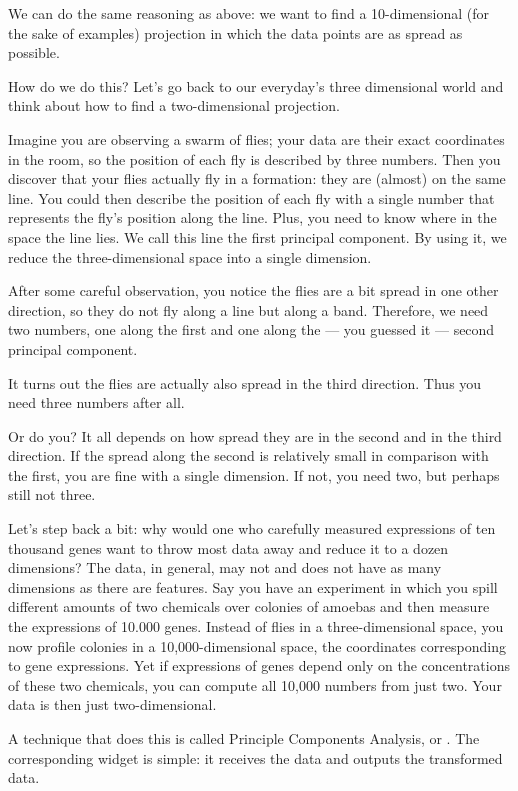 We can do the same reasoning as above: we want to find a 10-dimensional (for the sake of examples) projection in which the data  points are as spread as possible.

How do we do this? Let's go back to our everyday's three dimensional world and think about how to find a two-dimensional projection.

Imagine you are observing a swarm of flies; your data are their exact coordinates in the room, so the position of each fly is described by three numbers. Then you discover that your flies actually fly in a formation: they are (almost) on the same line. You could then describe the position of each fly with a single number that represents the fly's position along the line. Plus, you need to know where in the space the line lies. We call this line the first principal component. By using it, we reduce the three-dimensional space into a single dimension.

After some careful observation, you notice the flies are a bit spread in one other direction, so they do not fly along a line but along a band. Therefore, we need two numbers, one along the first and one along the — you guessed it — second principal component.

It turns out the flies are actually also spread in the third direction. Thus you need three numbers after all.

Or do you? It all depends on how spread they are in the second and in the third direction. If the spread along the second is relatively small in comparison with the first, you are fine with a single dimension. If not, you need two, but perhaps still not three.

Let's step back a bit: why would one who carefully measured expressions of ten thousand genes want to throw most data away and reduce it to a dozen dimensions? The data, in general, may not and does not have as many dimensions as there are features. Say you have an experiment in which you spill different amounts of two chemicals over colonies of amoebas and then measure the expressions of 10.000 genes. Instead of flies in a three-dimensional space, you now profile colonies in a 10,000-dimensional space, the coordinates corresponding to gene expressions. Yet if expressions of genes depend only on the concentrations of these two chemicals, you can compute all 10,000 numbers from just two. Your data is then just two-dimensional.

\newpage

A technique that does this is called Principle Components Analysis, or . The corresponding widget is simple: it receives the data and outputs the transformed data.

